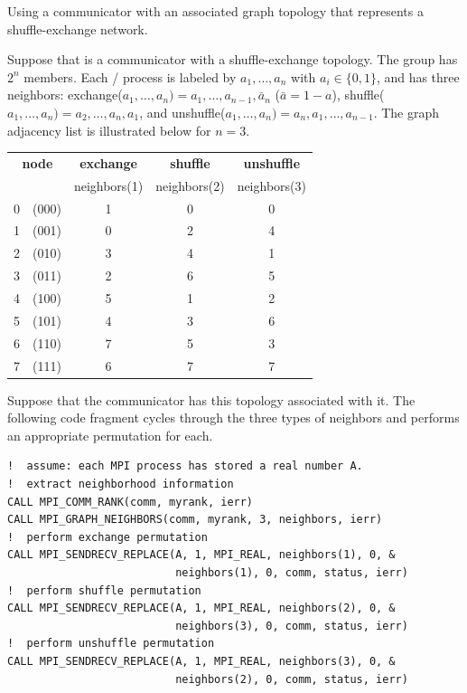 \begin{example}
\label{topol-exC}
%
Using a communicator with an associated graph topology that represents a shuffle-exchange network.

Suppose that  is a communicator with a
shuffle-exchange topology.   The group has $2^n$ members.
Each \MPI/ process is labeled by $a_1 , \ldots, a_n$ with $a_i \in
\{0,1\}$, and has three neighbors:
exchange($a_1 , \ldots, a_n ) = a_1 ,\ldots, a_{n-1}, \bar{a}_n$
($\bar{a} =
1-a$), shuffle($a_1 , \ldots, a_n )= a_2 , \ldots,
a_{n}, a_1$, and unshuffle($a_1 , \ldots, a_n ) = a_n , a_1 , \ldots , a_{n-1}$.
The graph adjacency list is illustrated below for $n=3$.

\begin{center}
\begin{tabular}{|cc|ccc|}
\hline
\multicolumn{2}{|c|}{\textbf{node}}&{\textbf{exchange}}&{\textbf{shuffle}}&{\textbf{unshuffle}}\\
  &       & neighbors(1) & neighbors(2) & neighbors(3) \\
\hline
0 & (000) & 1 & 0 & 0\\
1 & (001) & 0 & 2 & 4\\
2 & (010) & 3 & 4 & 1\\
3 & (011) & 2 & 6 & 5\\
4 & (100) & 5 & 1 & 2\\
5 & (101) & 4 & 3 & 6\\
6 & (110) & 7 & 5 & 3\\
7 & (111) & 6 & 7 & 7\\
\hline
\end{tabular}
\end{center}

Suppose that the communicator  has this topology associated with it.
The following code fragment cycles through the three types of neighbors
and performs an appropriate permutation for each.

\begin{lstlisting}[language={[MPI]Fortran}]
!  assume: each MPI process has stored a real number A.
!  extract neighborhood information
CALL MPI_COMM_RANK(comm, myrank, ierr)
CALL MPI_GRAPH_NEIGHBORS(comm, myrank, 3, neighbors, ierr)
!  perform exchange permutation
CALL MPI_SENDRECV_REPLACE(A, 1, MPI_REAL, neighbors(1), 0, &
                          neighbors(1), 0, comm, status, ierr)
!  perform shuffle permutation
CALL MPI_SENDRECV_REPLACE(A, 1, MPI_REAL, neighbors(2), 0, &
                          neighbors(3), 0, comm, status, ierr)
!  perform unshuffle permutation
CALL MPI_SENDRECV_REPLACE(A, 1, MPI_REAL, neighbors(3), 0, &
                          neighbors(2), 0, comm, status, ierr)
\end{lstlisting}

\end{example}

